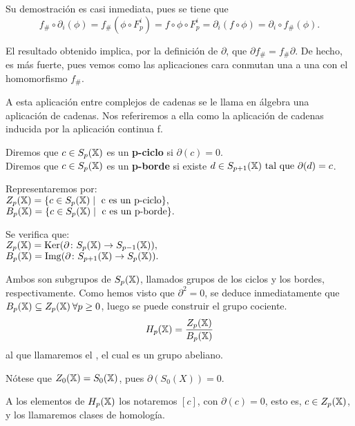 Su demostración es casi inmediata, pues se tiene que
\[ f_\# \circ \partial_i(\phi) = f_\#(\phi \circ F_p^i) = f \circ \phi \circ F_p^i = \partial_i(f \circ \phi) = \partial_i \circ f_\#(\phi). \]

El resultado obtenido implica, por la definición de $\partial$, que $\partial f_\# = f_\# \partial$. De hecho, es más fuerte, pues vemos
como las aplicaciones cara conmutan una a una con el homomorfismo $f_\#$.

A esta aplicación entre complejos de cadenas se le llama en álgebra una aplicación de cadenas. Nos referiremos a ella como la aplicación de cadenas
inducida por la aplicación continua f.

\begin{definition}
  Diremos que $c \in S_p({\mathbb X})$ es un \textbf{p-ciclo} si $\partial(c) = 0$. \\
  Diremos que $c \in S_p({\mathbb X})$ es un \textbf{p-borde} si existe $d \in S_{p+1}({\mathbb X}) \text{ tal que } \partial(d) = c$.
\end{definition}


Representaremos por: \\
$Z_p({\mathbb X}) = \{c \in S_p({\mathbb X}) \mid \text{ c es un p-ciclo}\},$ \\
$B_p({\mathbb X}) = \{c \in S_p({\mathbb X}) \mid \text{ c es un p-borde}\}.$

Se verifica que: \\
$Z_p({\mathbb X}) = \operatorname{Ker} (\partial \colon S_p({\mathbb X}) \to S_{p-1}({\mathbb X})),$ \\
$B_p({\mathbb X}) = \operatorname{Img} (\partial \colon S_{p+1}({\mathbb X}) \to S_p({\mathbb X})).$

Ambos son subgrupos de $S_p({\mathbb X})$, llamados grupos de los ciclos y los bordes, respectivamente. Como hemos visto que $\partial^2 = 0$, se deduce
inmediatamente que $B_p({\mathbb X}) \subseteq Z_p({\mathbb X}) \hspace{0.2em}\forall p \geq 0$, luego se puede construir el grupo cociente.
\begin{equation*}
  H_p({\mathbb X}) = \frac{\displaystyle Z_p({\mathbb X})}{\displaystyle B_p({\mathbb X})}
\end{equation*}
al que llamaremos el \textbf{\underline{}}, el cual es un grupo abeliano.

\begin{remark}
  Nótese que $Z_0({\mathbb X}) = S_0({\mathbb X})$, pues $\partial(S_0(X)) = 0$.
\end{remark}

A los elementos de $H_p({\mathbb X})$ los notaremos $[c]$, con $\partial(c) = 0$, esto es, $c \in Z_p({\mathbb X})$, y los llamaremos clases de homología.

